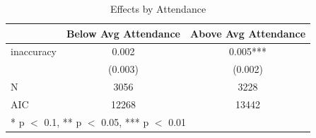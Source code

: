 \begin{table}
\centering
\caption{Effects by Attendance}
\centering
\begin{tabular}[t]{lcc}
\toprule
  & Below Avg Attendance & Above Avg Attendance\\
\midrule
inaccuracy & \num{0.002} & \num{0.005}***\\
 & (\num{0.003}) & (\num{0.002})\\
\midrule
N & \num{3056} & \num{3228}\\
AIC & \num{12268} & \num{13442}\\
\bottomrule
\multicolumn{3}{l}{\rule{0pt}{1em}* p $<$ 0.1, ** p $<$ 0.05, *** p $<$ 0.01}\\
\end{tabular}
\end{table}
